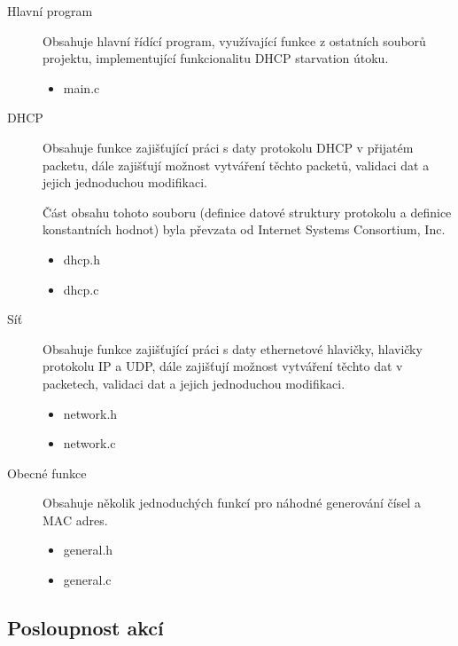 \documentclass[a4paper,11pt]{article}
\begin{document}
\begin{description}
	\item [Hlavní program] Obsahuje hlavní řídící program, využívající funkce z ostatních souborů projektu, implementující funkcionalitu DHCP starvation útoku.
	\begin{itemize}
		\item \textsf{main.c}
	\end{itemize}

	\item [DHCP] Obsahuje funkce zajišťující práci s daty protokolu DHCP v přijatém packetu, dále zajišťují možnost vytváření těchto packetů, validaci dat a jejich jednoduchou modifikaci.
	
	Část obsahu tohoto souboru (definice datové struktury protokolu a definice konstantních hodnot) byla převzata od Internet Systems Consortium, Inc.
	\begin{itemize}
		\item \textsf{dhcp.h}
		\item \textsf{dhcp.c}
	\end{itemize}

	\item [Síť] Obsahuje funkce zajišťující práci s daty ethernetové hlavičky, hlavičky protokolu IP a UDP, dále zajišťují možnost vytváření těchto dat v packetech, validaci dat a jejich jednoduchou modifikaci.
	\begin{itemize}
		\item \textsf{network.h}
		\item \textsf{network.c}
	\end{itemize}

	\item [Obecné funkce] Obsahuje několik jednoduchých funkcí pro náhodné generování čísel a MAC adres.
	\begin{itemize}
		\item \textsf{general.h}
		\item \textsf{general.c}
	\end{itemize}
\end{description}

\subsection{Posloupnost akcí}
\end{document}
